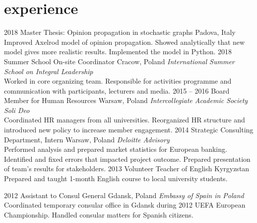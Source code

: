 \documentclass[]{appsilon} %
\begin{document}
\vspace{0cm}
\section{experience}

\begin{entrylist}
\entry
{2018}
{Master Thesis: Opinion propagation in stochastic graphs}
{Padova, Italy}
{Improved Axelrod model of opinion propagation. Showed analytically that new model gives more realistic results. Implemented the model in Python.}
\entry
{2018}
{Summer School On-site Coordinator}
{Cracow, Poland}
{\emph{International Summer School on Integral Leadership} \\
	Worked in core organizing team. Responsible for activities programme and communication with participants, lecturers and media.}
\entry
{2015 -- 2016}
{Board Member for Human Resources}
{Warsaw, Poland}
{\emph{Intercollegiate Academic Society Soli Deo} \\
Coordinated HR managers from all universities. Reorganized HR structure and introduced new policy to increase member engagement.
}
\entry
{2014}
{Strategic Consulting Department, Intern}
{Warsaw, Poland}
{\emph{Deloitte Advisory} \\
Performed analysis and prepared market statistics for European banking. Identified and fixed errors that impacted project outcome. Prepared presentation of team's results for stakeholders. }
\entry
{2013}
{Volunteer Teacher of English}
{Kyrgyzstan}
{Prepared and taught 1-month English course to local university students.}

\entry
{2012}
{Assistant to Consul General}
{Gdansk, Poland}
{\emph{Embassy of Spain in Poland} \\
Coordinated temporary consular office in Gdansk during 2012 UEFA European Championship. Handled consular matters for Spanish citizens.  
}
\end{entrylist}


\end{document}
